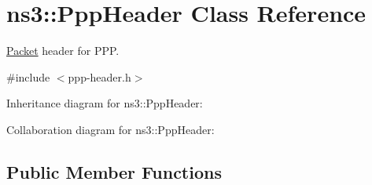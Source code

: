 \hypertarget{classns3_1_1PppHeader}{}\section{ns3\+:\+:Ppp\+Header Class Reference}
\label{classns3_1_1PppHeader}


\hyperlink{classns3_1_1Packet}{Packet} header for P\+PP.  




{\ttfamily \#include $<$ppp-\/header.\+h$>$}



Inheritance diagram for ns3\+:\+:Ppp\+Header\+:


Collaboration diagram for ns3\+:\+:Ppp\+Header\+:
\subsection*{Public Member Functions}
